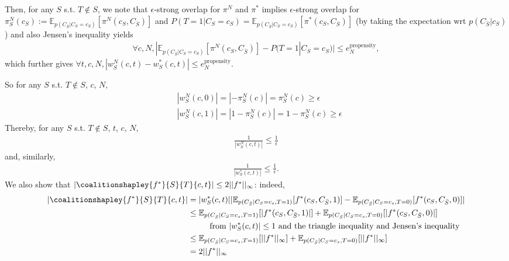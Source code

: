 Then, for any $S$ s.t. $T \notin S$, we note that $\epsilon$-strong overlap for $\pi^N$ and $\pi^*$ implies $\epsilon$-strong overlap for $\pi^N_S(c_S) := \mathbb{E}_{p(C_{\bar{S}}|C_S=c_S)}[\pi^N(c_S,C_{\bar{S}})]$ and $P(T=1|C_S=c_S) = \mathbb{E}_{p(C_{\bar{S}}|C_S=c_S)}[\pi^*(c_S,C_{\bar{S}})]$ (by taking the expectation wrt $p(C_{\bar{S}} | c_S)$) and also Jensen's inequality yields
\begin{align*}
    \forall c, N, |\mathbb{E}_{p(C_{\bar{S}}|C_S=c_S)}[\pi^N(c_S,C_{\bar{S}})] -P(T=1|C_S=c_S) | \leq e^\text{propensity}_N,
\end{align*}
which further gives $\forall t, c, N, |w^N_S(c,t) - w^*_S(c,t) | \leq e^\text{propensity}_N$.

So for any $S$ s.t. $T \notin S$, $c$, $N$,
\begin{align*}
    &|w^N_S(c,0)| = |-\pi^N_S(c)| = \pi^N_S(c) \geq \epsilon \\
    &|w^N_S(c,1)| = |1-\pi^N_S(c)| = 1-\pi^N_S(c) \geq \epsilon
\end{align*}
Thereby, for any $S$ s.t. $T \notin S$, $t$, $c$, $N$,
\begin{align*}
    \frac{1}{|w^N_S(c,t)|} \leq \frac{1}{\epsilon}
\end{align*}
and, similarly,
\begin{align*}
    \frac{1}{|w^*_S(c,t)|} \leq \frac{1}{\epsilon}.
\end{align*}
We also show that $|\coalitionshapley{f^*}{S}{T}{c,t}| \leq 2||f^*||_\infty$: indeed,
\begin{align*}
    |\coalitionshapley{f^*}{S}{T}{c,t}|
    &= |w^*_S(c,t)| |\mathbb{E}_{p(C_{\bar{S}}|C_S=c_s,T=1)}[f^*(c_S,C_{\bar{S}},1)] - \mathbb{E}_{p(C_{\bar{S}}|C_S=c_s,T=0)}[f^*(c_S,C_{\bar{S}},0)]| \\
    &\leq \mathbb{E}_{p(C_{\bar{S}}|C_S=c_s,T=1)} [|f^*(c_S,C_{\bar{S}},1)|] + \mathbb{E}_{p(C_{\bar{S}}|C_S=c_s,T=0)} [|f^*(c_S,C_{\bar{S}},0)|] \\
    & \ \ \ \ \ \ \ \text{ from } |w^*_S(c,t)| \leq 1
     \text{ and the triangle inequality and Jensen's inequality} \\
     &\leq \mathbb{E}_{p(C_{\bar{S}}|C_S=c_s,T=1)} [||f^*||_\infty] + \mathbb{E}_{p(C_{\bar{S}}|C_S=c_s,T=0)} [||f^*||_\infty] \\
     &= 2 ||f^*||_\infty
\end{align*}

